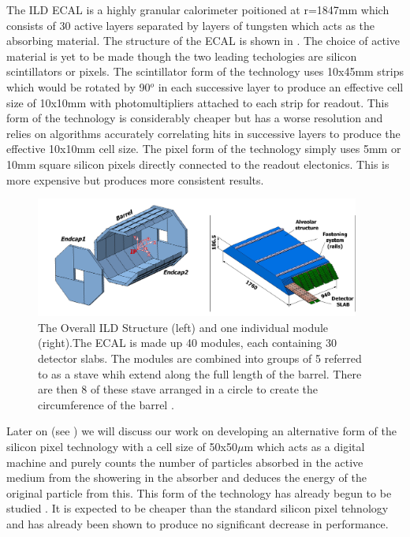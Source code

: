 The ILD ECAL is a highly granular calorimeter poitioned at r=1847mm which consists of 30 active layers separated by layers of tungsten which acts as the absorbing material. The structure of the \ac{ECAL} is shown in . The choice of active material is yet to be made though the two leading techologies are silicon scintillators or pixels. The scintillator form of the technology uses 10x45mm strips which would be rotated by 90${^o}$ in each successive layer to produce an effective cell size of 10x10mm with photomultipliers attached to each strip for readout. This form of the technology is considerably cheaper but has a worse resolution and relies on algorithms accurately correlating hits in successive layers to produce the effective 10x10mm cell size. The pixel form of the technology simply uses 5mm or 10mm square silicon pixels directly connected to the readout electonics. This is more expensive but produces more consistent results.

\begin{figure}[h]
  \centering
  \includegraphics[width=0.95\textwidth,keepaspectratio]{Experiments/fig/ecalstructure} %
  \caption[ECAL Structure]{The Overall ILD Structure (left) and one individual module (right).The ECAL is made up 40 modules, each containing 30 detector slabs. The modules are combined into groups of 5 referred to as a stave whih extend along the full length of the barrel. There are then 8 of these stave arranged in a circle to create the circumference of the barrel \cite{ILD}.}
  \label{Fig:ECAL}
\end{figure}

Later on (see ) we will discuss our work on developing an alternative form of the silicon pixel technology with a cell size of 50x50${\mu}$m which acts as a digital machine and purely counts the number of particles absorbed in the active medium from the showering in the absorber and deduces the energy of the original particle from this.  This form of the technology has already begun to be studied \cite{2011JInst...6.5009B}. It is expected to be cheaper than the standard silicon pixel tehnology and has already been shown to produce no significant decrease in performance.


